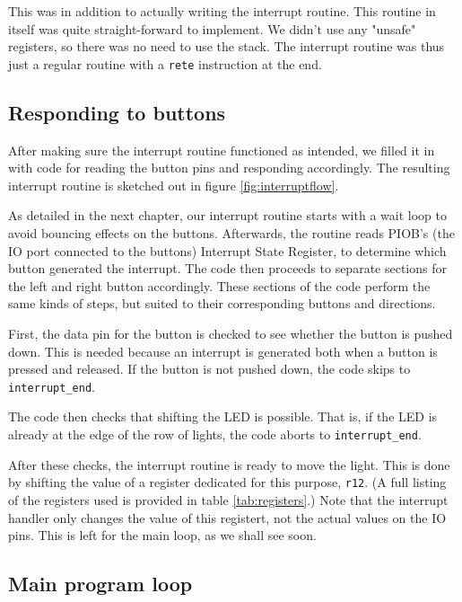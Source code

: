This was in addition to actually writing the interrupt routine. This
routine in itself was quite straight-forward to implement. We didn't use
any "unsafe" registers, so there was no need to use the stack. The
interrupt routine was thus just a regular routine with a \texttt{rete}
instruction at the end.

\subsection{Responding to buttons}

After making sure the interrupt routine functioned as intended, we
filled it in with code for reading the button pins and responding
accordingly. The resulting interrupt routine is sketched out in figure
\ref{fig:interruptflow}.



As detailed in the next chapter, our interrupt routine starts with a
wait loop to avoid bouncing effects on the buttons. Afterwards, the
routine reads PIOB's (the IO port connected to the buttons) Interrupt
State Register, to determine which button generated the interrupt. The
code then proceeds to separate sections for the left and right button
accordingly. These sections of the code perform the same kinds of steps,
but suited to their corresponding buttons and directions.

First, the data pin for the button is checked to see whether the button
is pushed down. This is needed because an interrupt is generated both
when a button is pressed and released. If the button is not pushed down,
the code skips to \texttt{interrupt\_end}.

The code then checks that shifting the LED is possible. That is, if the
LED is already at the edge of the row of lights, the code aborts to
\texttt{interrupt\_end}.

After these checks, the interrupt routine is ready to move the light.
This is done by shifting the value of a register dedicated for this
purpose, \texttt{r12}. (A full listing of the registers used is provided
in table \ref{tab:registers}.) Note that the interrupt handler only
changes the value of this registert, not the actual values on the IO
pins. This is left for the main loop, as we shall see soon.



\subsection{Main program loop}


